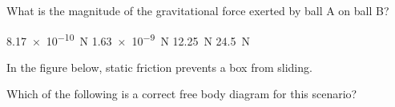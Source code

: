 \documentclass[answers]{exam}
\newif\ifversionKlevel
\begin{document}
\begin{questions}
What is the magnitude of the gravitational force exerted by ball A on ball B?

\begin{randomizeoneparchoices}
    \correctchoice \SI{8.17e-10}{N}
    \choice \SI{1.63e-9}{N}
    \choice \SI{12.25}{N}
    \choice \SI{24.5}{N}
\end{randomizeoneparchoices}

\ifversionKlevel
\question
In the figure below, static friction prevents a box from sliding.

\begin{center}
\end{center}

Which of the following is a correct free body diagram for this scenario?


\end{questions}
\end{document}
